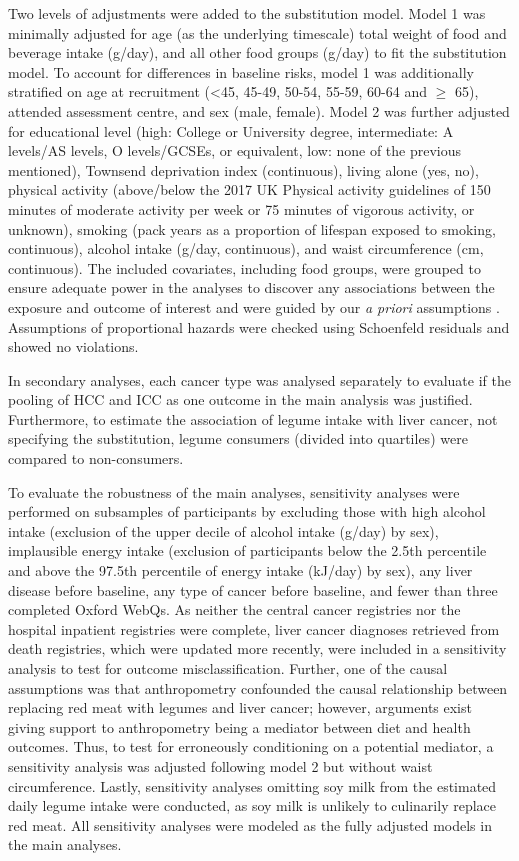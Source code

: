 \documentclass[
]{article}
\begin{document}
Two levels of adjustments were added to the substitution model. Model 1
was minimally adjusted for age (as the underlying timescale) total
weight of food and beverage intake (g/day), and all other food groups
(g/day) to fit the substitution model. To account for differences in
baseline risks, model 1 was additionally stratified on age at
recruitment (\textless45, 45-49, 50-54, 55-59, 60-64 and \(\geq\) 65), attended
assessment centre, and sex (male, female). Model 2 was further adjusted
for educational level (high: College or University degree, intermediate:
A levels/AS levels, O levels/GCSEs, or equivalent, low: none of the
previous mentioned), Townsend deprivation index (continuous), living
alone (yes, no), physical activity (above/below the 2017 UK Physical
activity guidelines of 150 minutes of moderate activity per week or 75
minutes of vigorous activity, or unknown), smoking (pack years as a
proportion of lifespan exposed to smoking, continuous), alcohol intake
(g/day, continuous), and waist circumference (cm, continuous). The
included covariates, including food groups, were grouped to ensure
adequate power in the analyses to discover any associations between the
exposure and outcome of interest and were guided by our \emph{a priori}
assumptions \autocite{protocol}. Assumptions of proportional hazards were
checked using Schoenfeld residuals and showed no violations.

In secondary analyses, each cancer type was analysed separately to
evaluate if the pooling of HCC and ICC as one outcome in the main
analysis was justified. Furthermore, to estimate the association of
legume intake with liver cancer, not specifying the substitution, legume
consumers (divided into quartiles) were compared to non-consumers.

To evaluate the robustness of the main analyses, sensitivity analyses
were performed on subsamples of participants by excluding those with
high alcohol intake (exclusion of the upper decile of alcohol intake
(g/day) by sex), implausible energy intake (exclusion of participants
below the 2.5th percentile and above the 97.5th percentile of energy
intake (kJ/day) by sex), any liver disease before baseline, any type of
cancer before baseline, and fewer than three completed Oxford WebQs. As
neither the central cancer registries nor the hospital inpatient
registries were complete, liver cancer diagnoses retrieved from death
registries, which were updated more recently, were included in a
sensitivity analysis to test for outcome misclassification. Further, one
of the causal assumptions was that anthropometry confounded the causal
relationship between replacing red meat with legumes and liver cancer;
however, arguments exist giving support to anthropometry being a
mediator between diet and health outcomes. Thus, to test for erroneously
conditioning on a potential mediator, a sensitivity analysis was
adjusted following model 2 but without waist circumference. Lastly,
sensitivity analyses omitting soy milk from the estimated daily legume
intake were conducted, as soy milk is unlikely to culinarily replace red
meat. All sensitivity analyses were modeled as the fully adjusted models
in the main analyses.
\end{document}
